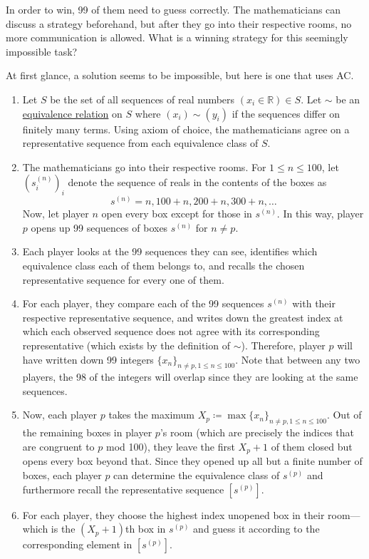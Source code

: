   In order to win, 99 of them need to guess correctly. The mathematicians can discuss a strategy beforehand, but after they go into their respective rooms, no more communication is allowed. What is a winning strategy for this seemingly impossible task? 

  At first glance, a solution seems to be impossible, but here is one that uses AC. 
  \begin{enumerate}
    \item Let $S$ be the set of all sequences of real numbers $(x_i \in \mathbb{R}) \in S$. Let $\sim$ be an \hyperref[def:equivalence_relation]{equivalence relation} on $S$ where $(x_i) \sim (y_i)$ if the sequences differ on finitely many terms. Using axiom of choice, the mathematicians agree on a representative sequence from each equivalence class of $S$. 

    \item The mathematicians go into their respective rooms. For $1 \leq n \leq 100$, let $(s^{(n)}_i)_i$ denote the sequence of reals in the contents of the boxes as 
      \begin{equation}
        s^{(n)} = n, 100 + n, 200 + n, 300 + n, \ldots 
      \end{equation}
      Now, let player $n$ open every box except for those in $s^{(n)}$. In this way, player $p$ opens up 99 sequences of boxes $s^{(n)}$ for $n \neq p$.  

    \item Each player looks at the 99 sequences they can see, identifies which equivalence class each of them belongs to, and recalls the chosen representative sequence for every one of them. 

    \item For each player, they compare each of the 99 sequences $s^{(n)}$ with their respective representative sequence, and writes down the greatest index at which each observed sequence does not agree with its corresponding representative (which exists by the definition of $\sim$). Therefore, player $p$ will have written down 99 integers $\{x_n\}_{n \neq p, 1 \leq n \leq 100}$. Note that between any two players, the 98 of the integers will overlap since they are looking at the same sequences. 

    \item Now, each player $p$ takes the maximum $X_p \coloneqq \max \{ x_n\}_{n \neq p, 1 \leq n \leq 100}$. Out of the remaining boxes in player $p$'s room (which are precisely the indices that are congruent to $p$ mod 100), they leave the first $X_p + 1$ of them closed but opens every box beyond that. Since they opened up all but a finite number of boxes, each player $p$ can determine the equivalence class of $s^{(p)}$ and furthermore recall the representative sequence $[s^{(p)}]$. 

    \item For each player, they choose the highest index unopened box in their room---which is the $(X_p + 1)$th box in $s^{(p)}$ and guess it according to the corresponding element in $[s^{(p)}]$. 
  \end{enumerate}

